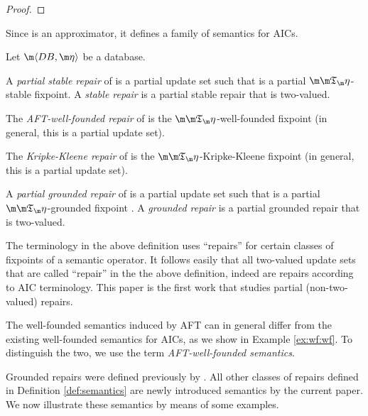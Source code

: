 {\begin{proof}
\end{proof}}

Since \Ap is an approximator, it defines a family of semantics for AICs. 

\begin{definition}\label{def:semantics}
 Let $\fulldb$ be a database. 
 \begin{compactitem}
  \item A \emph{partial stable repair} of \fulldb is a partial update set \UUU such that \UUU is a partial $\Ap$-stable fixpoint. A \emph{stable repair} is a partial stable repair that is two-valued. 
  \item The \emph{AFT-well-founded repair} of \fulldb is the $\Ap$-well-founded fixpoint (in general, this is a partial update set). 
  \item The \emph{Kripke-Kleene repair} of \fulldb is the $\Ap$-Kripke-Kleene fixpoint (in general, this is a partial update set). 
  \item A \emph{partial grounded repair} of \fulldb is a partial update set \UUU such that \UUU is a partial $\Ap$-grounded fixpoint . A \emph{grounded repair} is a partial grounded repair that is two-valued. 
 \end{compactitem}
\end{definition}

The terminology in the above definition uses ``repairs'' for certain classes of fixpoints of a semantic operator. It follows easily that  all two-valued update sets that are called ``repair'' in the the above definition, indeed are repairs according to AIC terminology. 
This paper is the first work that studies partial (non-two-valued) repairs. 
 

The well-founded semantics induced by AFT can in general differ from the existing well-founded semantics for AICs, as we show in Example \ref{ex:wf:wf}. To distinguish the two, we use the term \emph{AFT-well-founded semantics}. %

Grounded repairs were defined previously by \citet{iclp/Cruz-Filipe16}. All other classes of repairs defined in Definition \ref{def:semantics} are newly introduced semantics by the current paper. 
We now illustrate these semantics by means of some examples. 


